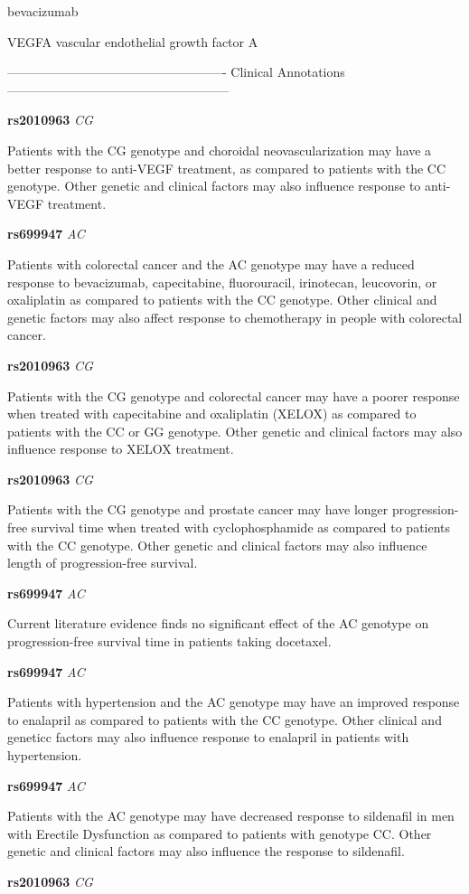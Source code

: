 \documentclass{resume} %
\begin{document}
\begin{rSection}{ bevacizumab }
\begin{rSubsection}{ VEGFA }{ vascular endothelial growth factor A }{}{}
\item[] ---------------------------------------------------- Clinical Annotations -----------------------------------------------------\newline
\item \textbf{ rs2010963 } \textit{ CG }
\item[] Patients with the CG genotype and choroidal neovascularization may have a better response to anti-VEGF treatment, as compared to patients with the CC genotype. Other genetic and clinical factors may also influence response to anti-VEGF treatment. \item \textbf{ rs699947 } \textit{ AC }
\item[] Patients with colorectal cancer and the AC genotype may have a reduced response to bevacizumab, capecitabine, fluorouracil, irinotecan, leucovorin, or oxaliplatin as compared to patients with the CC genotype. Other clinical and genetic factors may also affect response to chemotherapy in people with colorectal cancer.\item \textbf{ rs2010963 } \textit{ CG }
\item[] Patients with the CG genotype and colorectal cancer may have a poorer response when treated with capecitabine and oxaliplatin (XELOX) as compared to patients with the CC or GG genotype. Other genetic and clinical factors may also influence response to XELOX treatment.\item \textbf{ rs2010963 } \textit{ CG }
\item[] Patients with the CG genotype and prostate cancer may have longer progression-free survival time when treated with cyclophosphamide as compared to patients with the CC genotype. Other genetic and clinical factors may also influence length of progression-free survival.\item \textbf{ rs699947 } \textit{ AC }
\item[] Current literature evidence finds no significant effect of the AC genotype on progression-free survival time in patients taking docetaxel.\item \textbf{ rs699947 } \textit{ AC }
\item[] Patients with hypertension and the AC genotype may have an improved response to enalapril as compared to patients with the CC genotype. Other clinical and geneticc factors may also influence response to enalapril in patients with hypertension. \item \textbf{ rs699947 } \textit{ AC }
\item[] Patients with the AC genotype may have decreased response to sildenafil in men with Erectile Dysfunction as compared to patients with genotype CC. Other genetic and clinical factors may also influence the response to sildenafil.\item \textbf{ rs2010963 } \textit{ CG }

\end{rSubsection}
\end{rSection}
\end{document}
